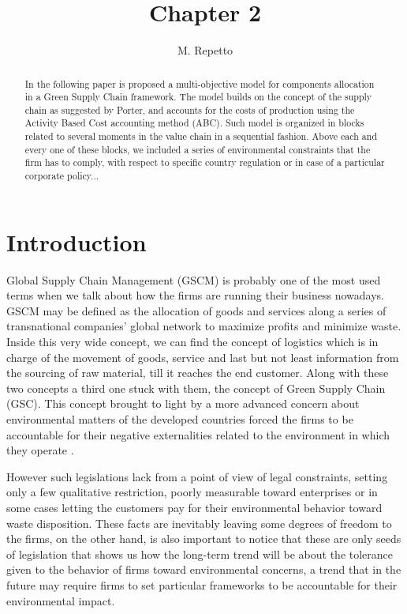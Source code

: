 \documentclass{article}
\begin{document}
  \title{Chapter 2}

  \author{M. Repetto}

  \date{}

\maketitle

\begin{abstract}
  In the following paper is proposed a multi-objective model for components allocation in a Green Supply Chain framework. The model builds on the concept of the supply chain as suggested by Porter, and accounts for the costs of production using the Activity Based Cost accounting method (ABC). Such model is organized in blocks related to several moments in the value chain in a sequential fashion. Above each and every one of these blocks, we included a series of environmental constraints that the firm has to comply, with respect to specific country regulation or in case of a particular corporate policy...
\end{abstract}

\section{Introduction}
  Global Supply Chain Management (GSCM) is probably one of the most used terms when we talk about how the firms are running their business nowadays. GSCM may be defined as the allocation of goods and services along a series of transnational companies' global network to maximize profits and minimize waste. Inside this very wide concept, we can find the concept of logistics which is in charge of the movement of goods, service and last but not least information from the sourcing of raw material, till it reaches the end customer.
  Along with these two concepts a third one stuck with them, the concept of Green Supply Chain (GSC). This concept brought to light by a more advanced concern about environmental matters of the developed countries forced the firms to be accountable for their negative externalities related to the environment in which they operate \cite{srivastava_green_2007}.

  However such legislations lack from a point of view of legal constraints, setting only a few qualitative restriction, poorly measurable toward enterprises or in some cases letting the customers pay for their environmental behavior toward waste disposition. These facts are inevitably leaving some degrees of freedom to the firms, on the other hand, is also important to notice that these are only seeds of legislation that shows us how the long-term trend will be about the tolerance given to the behavior of firms toward environmental concerns, a trend that in the future may require firms to set particular frameworks to be accountable for their environmental impact.
\end{document}
